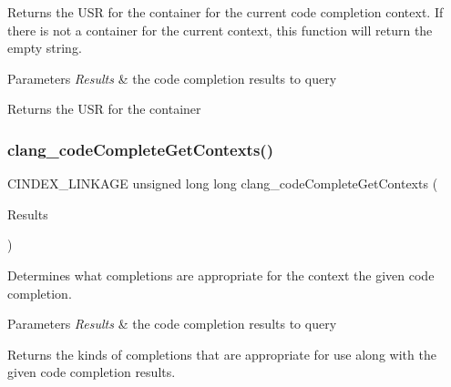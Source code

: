 Returns the U\+SR for the container for the current code completion context. If there is not a container for the current context, this function will return the empty string. 


\begin{DoxyParams}{Parameters}
{\em Results} & the code completion results to query\\
\hline
\end{DoxyParams}
\begin{DoxyReturn}{Returns}
the U\+SR for the container 
\end{DoxyReturn}
\mbox{\label{group__CINDEX__CODE__COMPLET_ga76f5354e478002585b6bd3aba1d20582}} 
\subsubsection{\texorpdfstring{clang\+\_\+code\+Complete\+Get\+Contexts()}{clang\_codeCompleteGetContexts()}}
{\footnotesize\ttfamily C\+I\+N\+D\+E\+X\+\_\+\+L\+I\+N\+K\+A\+GE unsigned long long clang\+\_\+code\+Complete\+Get\+Contexts (\begin{DoxyParamCaption}\item[{\mbox{\hyperlink{structCXCodeCompleteResults}{C\+X\+Code\+Complete\+Results}} $\ast$}]{Results }\end{DoxyParamCaption})}



Determines what completions are appropriate for the context the given code completion. 


\begin{DoxyParams}{Parameters}
{\em Results} & the code completion results to query\\
\hline
\end{DoxyParams}
\begin{DoxyReturn}{Returns}
the kinds of completions that are appropriate for use along with the given code completion results. 
\end{DoxyReturn}
\mbox{\label{group__CINDEX__CODE__COMPLET_gab298febc86d15c50265ff440e6da1913}} 
